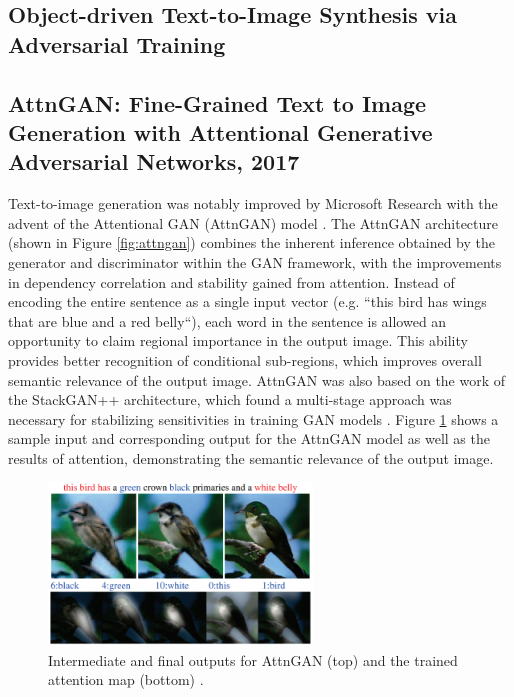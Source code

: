 \documentclass[letterpaper]{article} %
\begin{document}
\subsection{Object-driven Text-to-Image Synthesis via Adversarial Training}
\cite{objgan}

\subsection{AttnGAN: Fine-Grained Text to Image Generation
with Attentional Generative Adversarial Networks, 2017}
Text-to-image generation was notably improved by Microsoft Research 
with the advent of the Attentional GAN (AttnGAN) model \cite{attngan}.
The AttnGAN architecture (shown in Figure \ref{fig:attngan}) combines the 
inherent inference obtained by the generator and discriminator within the GAN 
framework, with the improvements in dependency correlation and stability gained 
from attention. Instead of encoding the entire sentence as a single input 
vector (e.g. ``this bird has wings that are blue and a red belly``), each word 
in the sentence is allowed an opportunity to claim regional importance in the 
output image. This ability provides better recognition of conditional 
sub-regions, which improves overall semantic relevance of the output image.  
AttnGAN was also based on the work of the StackGAN++ architecture, which found 
a multi-stage approach was necessary for stabilizing sensitivities in training 
GAN models \cite{stackgan++}. Figure \ref{fig:attngan_sample} shows a sample 
input and corresponding output for the AttnGAN model as well as the results of 
attention, demonstrating the semantic relevance of the output image.

\begin{figure}[htbp]
	\centerline{\includegraphics[width=7cm]{attngan_sample.png}}
	\caption{Intermediate and final outputs for AttnGAN (top) and the trained 
	attention map (bottom)
		\cite{attngan}.}
	\label{fig:attngan_sample}
\end{figure}

\end{document}
